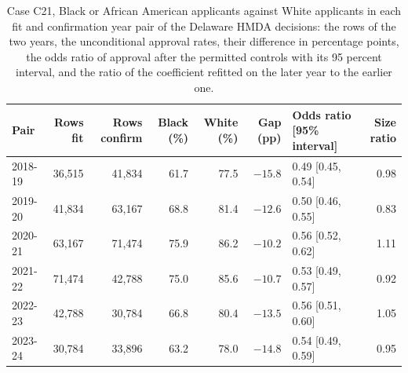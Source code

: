 \begin{table}[htbp]
\centering
\setlength{\tabcolsep}{3pt}
\footnotesize
\caption{Case C21, Black or African American applicants against White applicants in each fit and confirmation year pair of the Delaware HMDA decisions: the rows of the two years, the unconditional approval rates, their difference in percentage points, the odds ratio of approval after the permitted controls with its 95 percent interval, and the ratio of the coefficient refitted on the later year to the earlier one.}
\label{tab:vt-c21-pairs}
\begin{tabular}{lrrrrrlr}
\toprule
Pair & Rows fit & Rows confirm & Black (\%) & White (\%) & Gap (pp) & Odds ratio [95\% interval] & Size ratio \\
\midrule
2018-19 & 36,515 & 41,834 & 61.7 & 77.5 & $-15.8$ & 0.49 [0.45, 0.54] & 0.98 \\
2019-20 & 41,834 & 63,167 & 68.8 & 81.4 & $-12.6$ & 0.50 [0.46, 0.55] & 0.83 \\
2020-21 & 63,167 & 71,474 & 75.9 & 86.2 & $-10.2$ & 0.56 [0.52, 0.62] & 1.11 \\
2021-22 & 71,474 & 42,788 & 75.0 & 85.6 & $-10.7$ & 0.53 [0.49, 0.57] & 0.92 \\
2022-23 & 42,788 & 30,784 & 66.8 & 80.4 & $-13.5$ & 0.56 [0.51, 0.60] & 1.05 \\
2023-24 & 30,784 & 33,896 & 63.2 & 78.0 & $-14.8$ & 0.54 [0.49, 0.59] & 0.95 \\
\bottomrule
\end{tabular}
\end{table}
